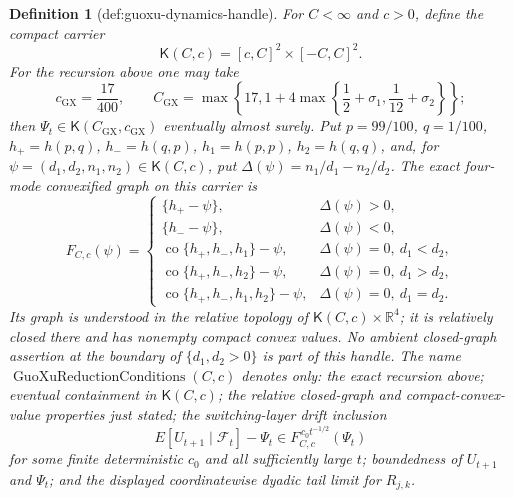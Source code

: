 \documentclass{article}
\newtheorem{definition}{Definition}
\begin{document}
\begin{definition}[def:guoxu-dynamics-handle]
For \(C<\infty\) and \(c>0\), define the compact carrier
\[
\mathsf K(C,c)=[c,C]^2\times[-C,C]^2.
\]
For the recursion above one may take
\[
c_{\mathrm{GX}}=\frac{17}{400},\qquad
C_{\mathrm{GX}}=\max\left\{17,1+4\max\left\{\frac12+\sigma_1,\frac1{12}+\sigma_2\right\}\right\};
\]
then \(\Psi_t\in\mathsf K(C_{\mathrm{GX}},c_{\mathrm{GX}})\) eventually almost surely. Put \(p=99/100\), \(q=1/100\), \(h_+=h(p,q)\), \(h_-=h(q,p)\), \(h_1=h(p,p)\), \(h_2=h(q,q)\), and, for \(\psi=(d_1,d_2,n_1,n_2)\in\mathsf K(C,c)\), put \(\Delta(\psi)=n_1/d_1-n_2/d_2\). The exact four-mode convexified graph on this carrier is
\[
F_{C,c}(\psi)=
\begin{cases}
\{h_+-\psi\},&\Delta(\psi)>0,\\
\{h_--\psi\},&\Delta(\psi)<0,\\
\operatorname{co}\{h_+,h_-,h_1\}-\psi,&\Delta(\psi)=0,\ d_1<d_2,\\
\operatorname{co}\{h_+,h_-,h_2\}-\psi,&\Delta(\psi)=0,\ d_1>d_2,\\
\operatorname{co}\{h_+,h_-,h_1,h_2\}-\psi,&\Delta(\psi)=0,\ d_1=d_2.
\end{cases}
\]
Its graph is understood in the relative topology of \(\mathsf K(C,c)\times\mathbb R^4\); it is relatively closed there and has nonempty compact convex values. No ambient closed-graph assertion at the boundary of \(\{d_1,d_2>0\}\) is part of this handle. The name \(\operatorname{GuoXuReductionConditions}(C,c)\) denotes only: the exact recursion above; eventual containment in \(\mathsf K(C,c)\); the relative closed-graph and compact-convex-value properties just stated; the switching-layer drift inclusion
\[
E[U_{t+1}\mid\mathcal F_t]-\Psi_t\in F_{C,c}^{\,c_0t^{-1/2}}(\Psi_t)
\]
for some finite deterministic \(c_0\) and all sufficiently large \(t\); boundedness of \(U_{t+1}\) and \(\Psi_t\); and the displayed coordinatewise dyadic tail limit for \(R_{j,k}\).


\end{definition}
\end{document}
